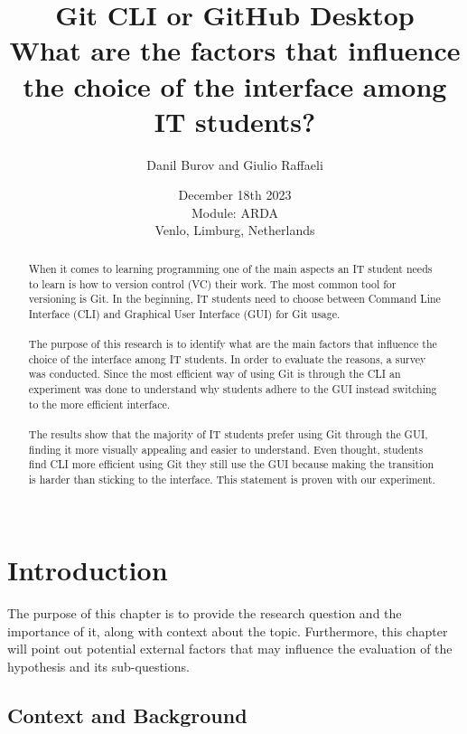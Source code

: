 \documentclass[]{report}
\title{Git CLI or GitHub Desktop \\ What are the factors that influence the choice of the interface among IT students?}
\author{Danil Burov and Giulio Raffaeli}
\date{December 18th 2023\\Module: ARDA \\Venlo, Limburg, Netherlands}
\begin{document}
	
	\maketitle
	

	\begin{abstract}
		When it comes to learning programming one of the main aspects an IT student needs to learn is how to version control (VC) their work. The most common tool for versioning is Git. In the beginning, IT students need to choose between Command Line Interface (CLI) and Graphical User Interface (GUI) for Git usage. \\\\
		
		
		The purpose of this research is to identify what are the main factors that influence the choice of the interface among IT students. In order to evaluate the reasons, a survey was conducted. Since the most efficient way of using Git is through the CLI an experiment was done to understand why students adhere to the GUI instead switching to the more efficient interface.\\\\
		
		The results show that the majority of IT students prefer using Git through the GUI, finding it more visually appealing and easier to understand. Even thought, students find CLI more efficient using Git they still use the GUI because making the transition is harder than sticking to the interface. This statement is proven with our experiment.\\\\
		
	\end{abstract}
	\tableofcontents
	\setcounter{page}{3}
	\listoffigures 
	\pagebreak
	
	
	\section{Introduction}
	The purpose of this chapter is to provide the research question and the importance of it, along with context about the topic. Furthermore, this chapter will point out potential external factors that may influence the evaluation of the hypothesis and its sub-questions. \\
	\subsection{Context and Background}
	
\end{document}
